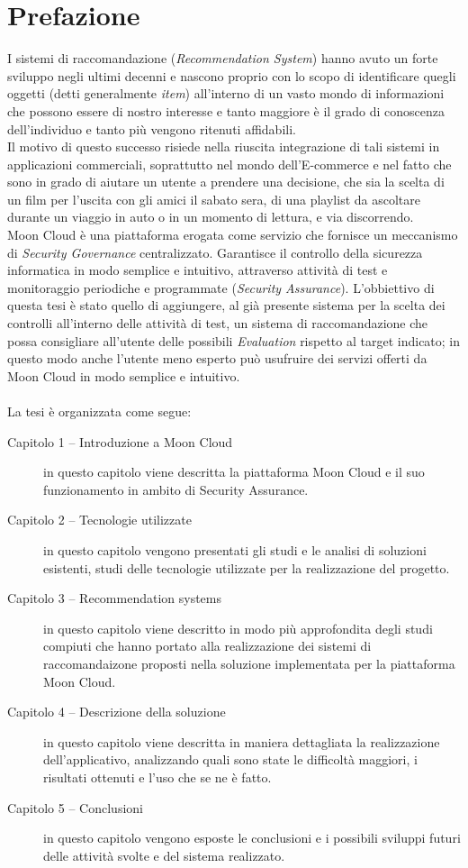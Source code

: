 \chapter{Prefazione}
I sistemi di raccomandazione (\textit{Recommendation System}) hanno avuto un forte sviluppo negli ultimi decenni e 
nascono proprio con lo scopo di identificare quegli oggetti (detti generalmente \textit{item}) all'interno di un vasto 
mondo di informazioni che possono essere di nostro interesse e tanto maggiore è il grado di conoscenza dell'individuo 
e tanto più vengono ritenuti affidabili.
\\
Il motivo di questo successo risiede nella riuscita integrazione di tali sistemi in applicazioni commerciali, 
soprattutto nel mondo dell’E-commerce e nel fatto che sono in grado di aiutare un utente a prendere una decisione, che sia la scelta di 
un film per l'uscita con gli amici il sabato sera, di una playlist da ascoltare durante un viaggio in auto o in un momento di lettura, 
e via discorrendo. 
\\
Moon Cloud è una piattaforma erogata come servizio che fornisce un meccanismo di \textit{Security Governance} centralizzato. 
Garantisce il controllo della sicurezza informatica in modo semplice e intuitivo, attraverso attività di test e monitoraggio 
periodiche e programmate (\textit{Security Assurance}). L'obbiettivo di questa tesi è stato quello di aggiungere, al già 
presente sistema per la scelta dei controlli all'interno delle attività di test, un sistema di raccomandazione che possa 
consigliare all'utente delle possibili \textit{Evaluation} rispetto al target indicato; in questo modo anche l'utente meno esperto può 
usufruire dei servizi offerti da Moon Cloud in modo semplice e intuitivo.  
\\
\\
La tesi è organizzata come segue:
\begin{description}
    \item[Capitolo 1 -- Introduzione a Moon Cloud] in questo capitolo viene descritta la piattaforma Moon Cloud e il suo funzionamento
    in ambito di Security Assurance. 
    \item[Capitolo 2 -- Tecnologie utilizzate] in questo capitolo vengono presentati gli studi e le analisi di soluzioni esistenti, 
    studi delle tecnologie utilizzate per la realizzazione del progetto.
    \item[Capitolo 3 -- Recommendation systems] in questo capitolo viene descritto in modo più approfondita degli studi compiuti che 
    hanno portato alla realizzazione dei sistemi di raccomandaizone proposti nella soluzione implementata per la piattaforma Moon Cloud. 
    \item[Capitolo 4 -- Descrizione della soluzione] in questo capitolo viene descritta in maniera dettagliata la realizzazione 
    dell'applicativo, analizzando quali sono state le difficoltà maggiori, i risultati ottenuti e l'uso che se ne è fatto. 
    \item[Capitolo 5 -- Conclusioni] in questo capitolo vengono esposte le conclusioni e i possibili sviluppi futuri delle attività
    svolte e del sistema realizzato.
\end{description}




